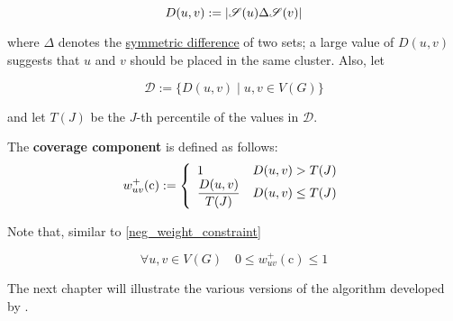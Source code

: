 \begin{equation}
    D(u, v) := \abs{\mathscr{S}(u) \Delta \mathscr{S}(v)}
\end{equation}

where $\Delta$ denotes the \href{https://en.wikipedia.org/wiki/Symmetric_difference}{symmetric difference} of two sets; a large value of $D(u, v)$ suggests that $u$ and $v$ should be placed in the same cluster. Also, let

\begin{equation}
    \mathscr{D} := \{D(u, v) \mid u, v \in V(G)\}
\end{equation}

and let $T(J)$ be the $J$-th percentile of the values in $\mathscr{D}$.

\begin{definition} \label{co_comp}
    The \textbf{coverage component} is defined as follows: $$w_{uv}^+(\mathrm c) := \soe{ll}{1 & D(u, v) > T(J) \\ \dfrac{D(u, v)}{T(J)} & D(u, v) \le T(J)}$$
\end{definition}

Note that, similar to \cref{neg_weight_constraint}

\begin{equation}
    \forall u, v \in V(G) \quad 0 \le w_{uv}^+(\mathrm c) \le 1
\end{equation}

The next chapter will illustrate the various versions of the algorithm developed by \textcite{c3}.

\cleardoublepage
